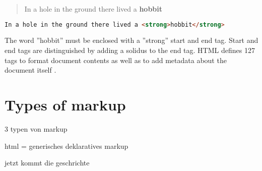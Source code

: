 \begin{quotation}
In a hole in the ground there lived a \textbf{hobbit}
\end{quotation}

\begin{lstlisting}[language=html, caption=Text formatted as bold with the ''strong'' tag, label=lst:html_markup_bold_example]
In a hole in the ground there lived a <strong>hobbit</strong>
\end{lstlisting}

The word ''hobbit'' must be enclosed with a ''strong'' start and end tag. Start and end tags are distinguished by adding a solidus to the end tag. HTML defines 127 tags to format document contents as well as to add metadata about the document itself \cite{mozel}.%

\section{Types of markup}

3 typen von markup

html = generisches deklaratives markup

jetzt kommt die geschrichte




